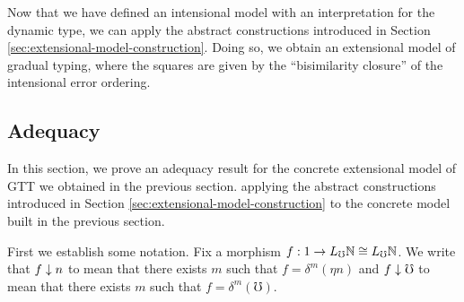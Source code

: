 \begin{comment}
\begin{align*}
\end{align*}

And for the perturbations, we take









\end{comment}



Now that we have defined an intensional model with an interpretation for the dynamic type, we can apply
the abstract constructions introduced in Section \ref{sec:extensional-model-construction}.
Doing so, we obtain an extensional model of gradual typing, where the squares are given by the
``bisimilarity closure'' of the intensional error ordering.

\subsection{Adequacy}\label{sec:adequacy}

In this section, we prove an adequacy result for the concrete extensional model of GTT we obtained in the previous section.
applying the abstract constructions introduced in Section
\ref{sec:extensional-model-construction} to the concrete model built in the previous section.

First we establish some notation. Fix a morphism $f : 1 \to L_\mho \mathbb{N} \cong L_\mho \mathbb{N}$.
We write that $f \downarrow n$ to mean that there exists $m$ such that $f = \delta^m(\eta n)$
and $f \downarrow \mho$ to mean that there exists $m$ such that $f = \delta^m(\mho)$.

